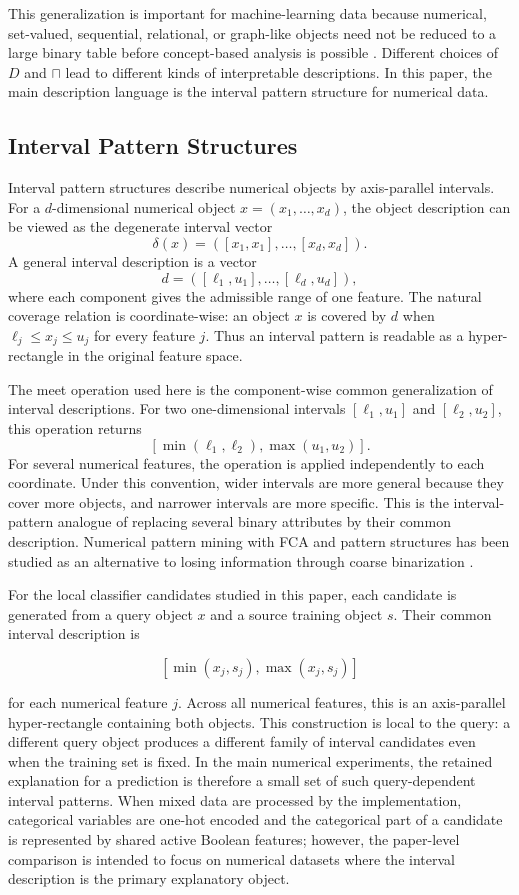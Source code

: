 \documentclass[11pt]{article}
\begin{document}
This generalization is important for machine-learning data because numerical,
set-valued, sequential, relational, or graph-like objects need not be reduced
to a large binary table before concept-based analysis is possible
\cite{kuznetsov2013fitting,kaytoue2015pattern,buzmakov2016mining}. Different
choices of $D$ and $\sqcap$ lead to different kinds of interpretable
descriptions. In this paper, the main description language is the interval
pattern structure for numerical data.

\subsection{Interval Pattern Structures}

Interval pattern structures describe numerical objects by axis-parallel
intervals. For a $d$-dimensional numerical object
$x=(x_1,\ldots,x_d)$, the object description can be viewed as the degenerate
interval vector
\[
    \delta(x) = ([x_1,x_1],\ldots,[x_d,x_d]).
\]
A general interval description is a vector
\[
    d = ([\ell_1,u_1],\ldots,[\ell_d,u_d]),
\]
where each component gives the admissible range of one feature. The natural
coverage relation is coordinate-wise: an object $x$ is covered by $d$ when
$\ell_j \leq x_j \leq u_j$ for every feature $j$. Thus an interval pattern is
readable as a hyper-rectangle in the original feature space.

The meet operation used here is the component-wise common generalization of
interval descriptions. For two one-dimensional intervals
$[\ell_1,u_1]$ and $[\ell_2,u_2]$, this operation returns
\[
    [\min(\ell_1,\ell_2), \max(u_1,u_2)].
\]
For several numerical features, the operation is applied independently to
each coordinate. Under this convention, wider intervals are more general
because they cover more objects, and narrower intervals are more specific.
This is the interval-pattern analogue of replacing several binary attributes
by their common description. Numerical pattern mining with FCA and pattern
structures has been studied as an alternative to losing information through
coarse binarization \cite{article}.

For the local classifier candidates studied in this paper, each candidate is
generated from a query object $x$ and a source training object $s$. Their
common interval description is

\[
    [\min(x_j, s_j), \max(x_j, s_j)]
\]

for each numerical feature $j$. Across all numerical features, this is an
axis-parallel hyper-rectangle containing both objects. This construction is
local to the query: a different query object produces a different family of
interval candidates even when the training set is fixed. In the main
numerical experiments, the retained explanation for a prediction is therefore
a small set of such query-dependent interval patterns. When mixed data are
processed by the implementation, categorical variables are one-hot encoded and
the categorical part of a candidate is represented by shared active Boolean
features; however, the paper-level comparison is intended to focus on
numerical datasets where the interval description is the primary explanatory
object.
\end{document}
